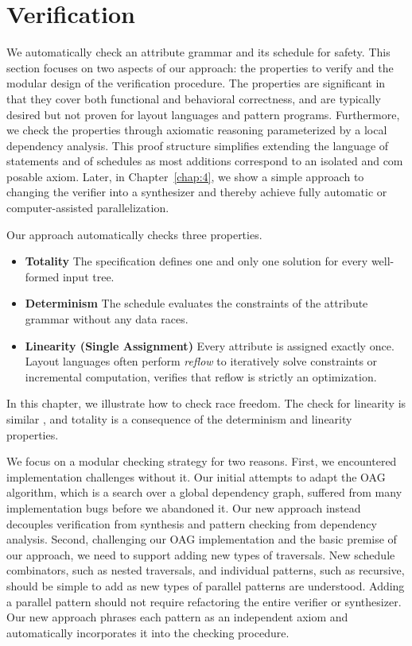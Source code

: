 \section{Verification}

We automatically check an attribute grammar and its schedule for safety. This section focuses on two aspects of our approach: the properties to verify and the modular design of the verification procedure. The properties are significant in that they cover both functional and behavioral correctness, and are typically desired but not proven for layout languages and pattern programs. Furthermore, we check the properties through axiomatic reasoning parameterized by a local dependency analysis. This proof structure simplifies extending the language of statements and of schedules as most additions correspond to an isolated and com posable axiom. Later, in Chapter~\ref{chap:4}, we show a simple approach to changing the verifier into a synthesizer and thereby achieve fully automatic or computer-assisted parallelization.

Our approach automatically checks three properties. 
\begin{itemize}
\item \textbf{Totality} The specification defines one and only one solution for every well-formed input tree. 
\item \textbf{Determinism} The schedule evaluates the constraints of the attribute grammar without any data races.
\item \textbf{Linearity (Single Assignment)} Every attribute is assigned exactly once. Layout languages often perform \emph{reflow} to iteratively solve constraints or incremental computation, verifies that reflow is strictly an optimization.
\end{itemize}
In this chapter, we illustrate how to check race freedom. The check for linearity is similar , and totality is a consequence of the determinism and linearity properties.

We focus on a modular checking strategy for two reasons. First, we encountered implementation challenges without it. Our initial attempts to adapt the OAG~\cite{oag} algorithm, which is a search over a global dependency graph, suffered from many implementation bugs before we abandoned it. Our new approach instead decouples verification from synthesis and pattern checking from dependency analysis. Second, challenging our OAG implementation and the basic premise of our approach, we need to support adding new types of traversals. New schedule combinators, such as nested traversals, and individual patterns, such as recursive, should be simple to add as new types of parallel patterns are understood. Adding a parallel pattern should not require refactoring the entire verifier or synthesizer. Our new approach phrases each pattern as an independent axiom and automatically incorporates it into the checking procedure.


